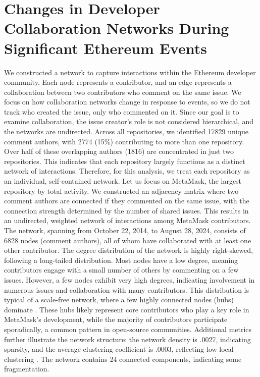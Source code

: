 \section{Changes in Developer Collaboration Networks During Significant Ethereum Events}\label{RQ4}




We constructed a network to capture interactions within the Ethereum developer community. Each node represents a contributor, and an edge represents a collaboration between two contributors who comment on the same issue. We focus on how collaboration networks change in response to events, so we do not track who created the issue, only who commented on it. Since our goal is to examine collaboration, the issue creator's role is not considered hierarchical, and the networks are undirected.
Across all repositories, we identified 17829 unique comment authors, with 2774 (15\%) contributing to more than one repository. Over half of these overlapping authors (1816) are concentrated in just two repositories. This indicates that each repository largely functions as a distinct network of interactions. Therefore, for this analysis, we treat each repository as an individual, self-contained network.
Let us focus on MetaMask, the largest repository by total activity. We constructed an adjacency matrix where two comment authors are connected if they commented on the same issue, with the connection strength determined by the number of shared issues. This results in an undirected, weighted network of interactions among MetaMask contributors.
The network, spanning from October 22, 2014, to August 28, 2024, consists of 6828 nodes (comment authors), all of whom have collaborated with at least one other contributor. The degree distribution of the network is highly right-skewed, following a long-tailed distribution. Most nodes have a low degree, meaning contributors engage with a small number of others by commenting on a few issues. However, a few nodes exhibit very high degrees, indicating involvement in numerous issues and collaboration with many contributors.
This distribution is typical of a scale-free network, where a few highly connected nodes (hubs) dominate \cite{barabasi2009scale}. These hubs likely represent core contributors who play a key role in MetaMask's development, while the majority of contributors participate sporadically, a common pattern in open-source communities.
Additional metrics further illustrate the network structure: the network density is .0027, indicating sparsity, and the average clustering coefficient is .0003, reflecting low local clustering \cite{newman2012communities}. The network contains 24 connected components, indicating some fragmentation.



